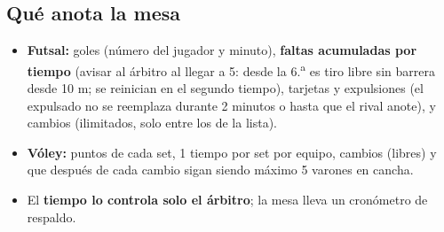 \subsection{Qué anota la mesa}
\begin{itemize}
	\item \textbf{Futsal:} goles (número del jugador y minuto), \textbf{faltas acumuladas por tiempo} (avisar al árbitro al llegar a 5: desde la 6.\textsuperscript{a} es tiro libre sin barrera desde 10 m; se reinician en el segundo tiempo), tarjetas y expulsiones (el expulsado no se reemplaza durante 2 minutos o hasta que el rival anote), y cambios (ilimitados, solo entre los de la lista).
	\item \textbf{Vóley:} puntos de cada set, 1 tiempo por set por equipo, cambios (libres) y que después de cada cambio sigan siendo máximo 5 varones en cancha.
	\item El \textbf{tiempo lo controla solo el árbitro}; la mesa lleva un cronómetro de respaldo.
\end{itemize}


